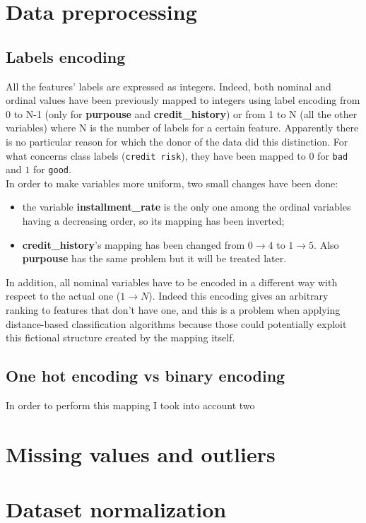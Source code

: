 \documentclass[letterpaper]{article}
\begin{document}
	\section{Data preprocessing}
	\subsection{Labels encoding}
	All the features' labels are expressed as integers. Indeed, both nominal and ordinal values have been previously mapped to integers using label encoding from 0 to N-1 (only for \textbf{purpouse} and \textbf{credit\_history}) or from 1 to N (all the other variables) where N is the number of labels for a certain feature. Apparently there is no particular reason for which the donor of the data did this distinction. For what concerns class labels (\texttt{credit risk}), they have been mapped to $0$ for \texttt{bad} and $1$ for \texttt{good}. \\
	In order to make variables more uniform, two small changes have been done:
	\begin{itemize}
		\item the variable \textbf{installment\_rate} is the only one among the ordinal variables having a decreasing order, so its mapping has been inverted;
		\item \textbf{credit\_history}'s mapping has been changed from $0 \rightarrow 4$ to $1 \rightarrow 5$. Also \textbf{purpouse} has the same problem but it will be treated later.
	\end{itemize}
	In addition, all nominal variables have to be encoded in a different way with respect to the actual one ($1 \rightarrow N$). Indeed this encoding gives an arbitrary ranking to features that don't have one, and this is a problem when applying distance-based classification algorithms because those could potentially exploit this fictional structure created by the mapping itself. 
	\subsection{One hot encoding vs binary encoding}
	In order to perform this mapping I took into account two 
	\section{Missing values and outliers}
	\section{Dataset normalization}
	
\end{document}
